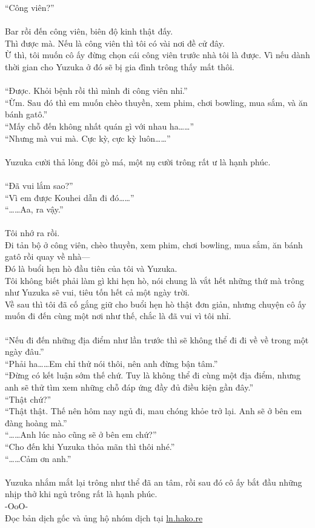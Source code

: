 \documentclass[12pt,a4paper, twosides]{book}
\begin{document}
“Công viên?”\\
\\
Bar rồi đến công viên, biên độ kinh thật đấy.\\
Thì được mà. Nếu là công viên thì tôi có vài nơi đề cử đây.\\
Ừ thì, tôi muốn cô ấy đừng chọn cái công viên trước nhà tôi là được. Vì nếu dành thời gian cho Yuzuka ở đó sẽ bị gia đình trông thấy mất thôi.\\
\\
“Được. Khỏi bệnh rồi thì mình đi công viên nhỉ.”\\
“Ừm. Sau đó thì em muốn chèo thuyền, xem phim, chơi bowling, mua sắm, và ăn bánh gatô.”\\
“Mấy chỗ đến không nhất quán gì với nhau ha……”\\
“Nhưng mà vui mà. Cực kỳ, cực kỳ luôn……”\\
\\
Yuzuka cười thả lỏng đôi gò má, một nụ cười trông rất ư là hạnh phúc.\\
\\
“Đã vui lắm sao?”\\
“Vì em được Kouhei dẫn đi đó……”\\
“……Aa, ra vậy.”\\
\\
Tôi nhớ ra rồi.\\
Đi tản bộ ở công viên, chèo thuyền, xem phim, chơi bowling, mua sắm, ăn bánh gatô rồi quay về nhà—\\
Đó là buổi hẹn hò đầu tiên của tôi và Yuzuka.\\
Tôi không biết phải làm gì khi hẹn hò, nói chung là vắt hết những thứ mà trông như Yuzuka sẽ vui, tiêu tốn hết cả một ngày trời.\\
Về sau thì tôi đã cố gắng giữ cho buổi hẹn hò thật đơn giản, nhưng chuyện cô ấy muốn đi đến cùng một nơi như thế, chắc là đã vui vì tôi nhỉ.\\
\\
“Nếu đi đến những địa điểm như lần trước thì sẽ không thể đi đi về về trong một ngày đâu.”\\
“Phải ha……Em chỉ thử nói thôi, nên anh đừng bận tâm.”\\
“Đừng có kết luận sớm thế chứ. Tuy là không thể đi cùng một địa điểm, nhưng anh sẽ thử tìm xem những chỗ đáp ứng đầy đủ điều kiện gần đây.”\\
“Thật chứ?”\\
“Thật thật. Thế nên hôm nay ngủ đi, mau chóng khỏe trở lại. Anh sẽ ở bên em đàng hoàng mà.”\\
“……Anh lúc nào cũng sẽ ở bên em chứ?”\\
“Cho đến khi Yuzuka thỏa mãn thì thôi nhé.”\\
“……Cảm ơn anh.”\\
\\
Yuzuka nhắm mắt lại trông như thể đã an tâm, rồi sau đó cô ấy bắt đầu những nhịp thở khi ngủ trông rất là hạnh phúc.\\
-OoO-\\
Đọc bản dịch gốc và ủng hộ nhóm dịch tại \href{https://ln.hako.re/}{ln.hako.re}\\
\newpage
\end{document}
